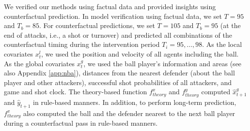 \documentclass[journal]{IEEEtran}
\begin{document}
We verified our methods using factual data and provided insights using counterfactual prediction.
In model verification using factual data, we set $T=95$ and $T_b = 85$.
For counterfactual predictions, we set $T=105$ and $T_b = 95$ (at the end of attacks, i.e., a shot or turnover) and predicted all combinations of the counterfactual timing during the intervention period $T_i = 95,\ldots,98$. 
As the local covariates $x^l_t$, we used the position and velocity of all agents including the ball.
As the global covariates $x^g_t$, we used the ball player's information and areas (see also Appendix \ref{app:nba}), distances from the nearest defender (about the ball player and other attackers), successful shot probabilities of all attackers, and game and shot clock.
The theory-based function $f^x_{theory}$ and $f^y_{theory}$ computed %
$\hat{x}^g_{t+1}$ and $\hat{y}_{t+1}$ in rule-based manners.
In addition, to perform long-term prediction, $f^x_{theory}$ also computed the ball and the defender nearest to the next ball player during a counterfactual pass in rule-based manners.
\end{document}
